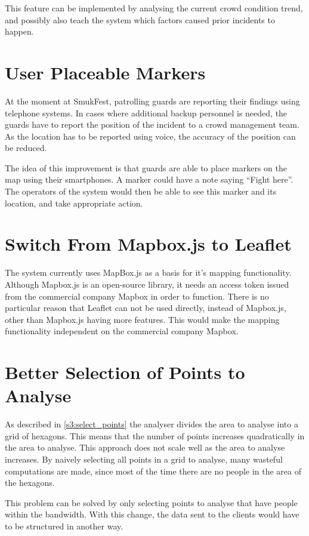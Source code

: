 This feature can be implemented by analysing the current crowd condition trend, and possibly also teach the system which factors caused prior incidents to happen.

\section{User Placeable Markers}
At the moment at SmukFest, patrolling guards are reporting their findings using telephone systems. In cases where additional backup personnel is needed, the guards have to report the position of the incident to a crowd management team. As the location has to be reported using voice, the accuracy of the position can be reduced.

The idea of this improvement is that guards are able to place markers on the map using their smartphones. A marker could have a note saying \enquote{Fight here}. The operators of the system would then be able to see this marker and its location, and take appropriate action.

\section{Switch From Mapbox.js to Leaflet}
The system currently uses MapBox.js as a basis for it's mapping functionality. Although Mapbox.js is an open-source library, it needs an access token issued from the commercial company Mapbox in order to function. There is no particular reason that Leaflet can not be used directly, instead of Mapbox.js, other than Mapbox.js having more features. This would make the mapping functionality independent on the commercial company Mapbox.

\section{Better Selection of Points to Analyse}
As described in \cref{s3:select_points} the analyser divides the area to analyse into a grid of hexagons. This means that the number of points increases quadratically in the area to analyse. This approach does not scale well as the area to analyse increases. By naively selecting all points in a grid to analyse, many wasteful computations are made, since most of the time there are no people in the area of the hexagons.

This problem can be solved by only selecting points to analyse that have people within the bandwidth. With this change, the data sent to the clients would have to be structured in another way.